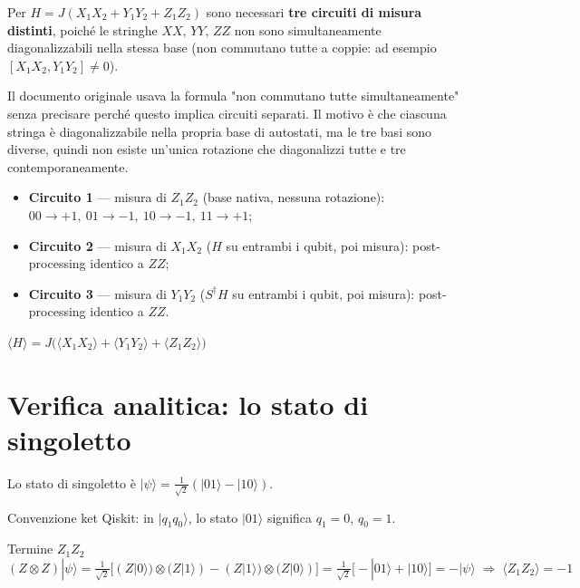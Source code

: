 \documentclass[11pt,a4paper]{article}
\begin{document}
Per $H=J(X_1X_2+Y_1Y_2+Z_1Z_2)$ sono necessari \textbf{tre circuiti di
misura distinti}, poiché le stringhe $XX$, $YY$, $ZZ$ non sono
simultaneamente diagonalizzabili nella stessa base (non commutano tutte
a coppie: ad esempio $[X_1X_2,Y_1Y_2]\neq0$).

\begin{editnote}
Il documento originale usava la formula "non commutano tutte
simultaneamente" senza precisare perché questo implica circuiti
separati. Il motivo è che ciascuna stringa è diagonalizzabile nella
propria base di autostati, ma le tre basi sono diverse, quindi non
esiste un'unica rotazione che diagonalizzi tutte e tre
contemporaneamente.
\end{editnote}

\begin{itemize}[leftmargin=1.3em,itemsep=0.25em]
\item \textbf{Circuito 1} --- misura di $Z_1Z_2$ (base nativa, nessuna
rotazione): $00\to+1,\ 01\to-1,\ 10\to-1,\ 11\to+1$;
\item \textbf{Circuito 2} --- misura di $X_1X_2$ ($H$ su entrambi i
qubit, poi misura): post-processing identico a $ZZ$;
\item \textbf{Circuito 3} --- misura di $Y_1Y_2$ ($S^\dagger H$ su
entrambi i qubit, poi misura): post-processing identico a $ZZ$.
\end{itemize}

\begin{keyeq}
\centering
$\langle H\rangle = J\big(\langle X_1X_2\rangle+\langle Y_1Y_2\rangle+\langle Z_1Z_2\rangle\big)$
\end{keyeq}

\section{Verifica analitica: lo stato di singoletto}

Lo stato di singoletto è $|\psi\rangle=\tfrac{1}{\sqrt2}(|01\rangle-|10\rangle)$.

\begin{editnote}
Convenzione ket Qiskit: in $|q_1q_0\rangle$, lo stato $|01\rangle$
significa $q_1=0$, $q_0=1$.
\end{editnote}

\begin{okbox}{Termine $Z_1Z_2$}
$(Z\otimes Z)|\psi\rangle=\frac{1}{\sqrt2}\big[(Z|0\rangle)\otimes(Z|1\rangle)-(Z|1\rangle)\otimes(Z|0\rangle)\big]
=\frac{1}{\sqrt2}\big[-|01\rangle+|10\rangle\big]=-|\psi\rangle
\;\Rightarrow\; \langle Z_1Z_2\rangle=-1$
\end{okbox}
\smallskip
\end{document}
